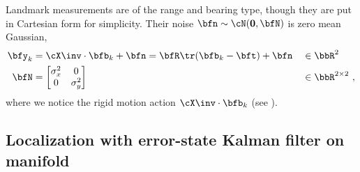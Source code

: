 %
Landmark measurements are of the range and bearing type, though they are put in Cartesian form for simplicity. 
Their noise $\bfn\sim\cN({\bf0},\bfN)$ is zero mean Gaussian,
%
\begin{align}\label{equ:meas_beacon}
\bfy_k &= \cX\inv\cdot\bfb_k + \bfn = \bfR\tr(\bfb_k-\bft) + \bfn	&&\in \bbR^2
\\
\bfN &= \begin{bmatrix}
\sigma_x^2 &0 \\ 0& \sigma_y^2
\end{bmatrix}										&&\in\bbR^{2\times2}
~,
\end{align}
%
where we notice the rigid motion action $\cX\inv\cdot\bfb_k$ (see ).




\subsection{Localization with error-state Kalman filter on manifold}
\label{sec:loc_ESKF}

